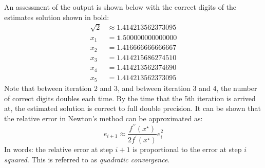An assessment of the output is shown below with the correct digits of the estimates solution shown in bold:
\begin{align*}
\sqrt{2} &\approx 1.414213562373095 \\
x_1 &= \mathbf{1.}500000000000000 \\
x_2 &= \mathbf{1.41}6666666666667 \\
x_3 &= \mathbf{1.41421}5686274510 \\
x_4 &= \mathbf{1.41421356237}4690 \\
x_5 &= \mathbf{1.414213562373095} 
\end{align*}
Note that between iteration 2 and 3, and between iteration 3 and 4, the number of correct digits doubles each time.  By the time that the 5th iteration is arrived at, the estimated solution is correct to full double precision.  It can be shown\cite{stewart1993afternotes} that the relative error in Newton's method can be approximated as:
\begin{equation*}
e_{i+1} \approx \frac{f^{\prime \prime}(x^{\star})}{2 f^{\prime}(x^{\star})}e_{i}^2
\end{equation*}
In words: the relative error at step $i+1$ is proportional to the error at step $i$ \emph{squared}.  This is referred to as \emph{quadratic convergence}.

